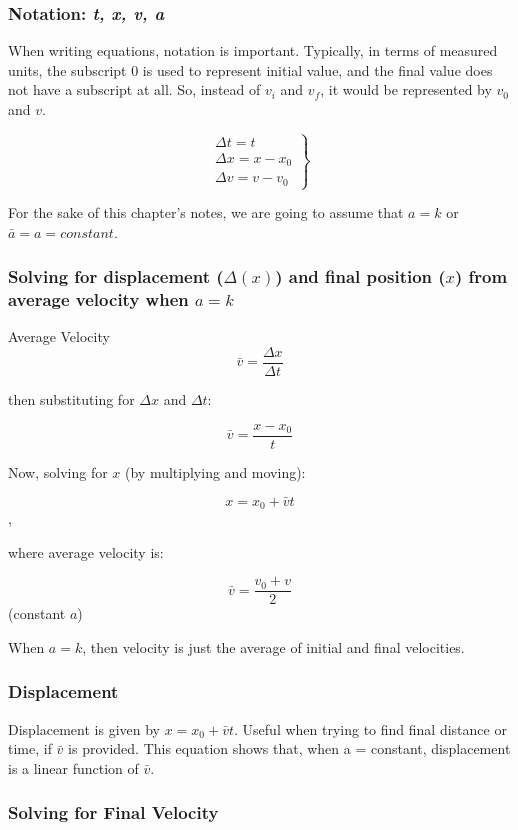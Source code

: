 \documentclass{article}
\begin{document}
\subsubsection{Notation: \emph{t, x, v, a}}

When writing equations, notation is important. Typically, in terms of measured units, the subscript 0 is used to represent initial {value}, and the final value does not have a subscript at all. So, instead of $v_i$ and $v_f$, it would be represented by $v_0$ and $v$.

\[\left. \begin{array}{l}
  \Delta{t} = t \\ \Delta{x} = x - x_0 \\ \Delta{v} = v - v_0 \end{array} \right\} \]

For the sake of this chapter's notes, we are going to assume that $a = k$ or $\bar{a} = a = constant$.


\subsubsection{Solving for displacement ($\Delta(x)$) and final position ($x$) from average velocity when $a = k$}
  
Average Velocity \[\bar{v} = \frac{\Delta{x}}{\Delta{t}}\]

then substituting for $\Delta{x}$ and $\Delta{t}$:

\[\bar{v} = \frac{x - x_0}{t}\]

Now, solving for $x$ (by multiplying and moving):

\[ x = x_0 + \bar{v} t \],

where average velocity is:

\[\bar{v} = \frac{v_0 + v}{2}\](constant $a$)

When $a=k$, then velocity is just the average of initial and final velocities.

\subsubsection{Displacement}

Displacement is given by $x = x_0 + \bar{v}t$. Useful when trying to find final distance or time, if $\bar{v}$ is provided.
This equation shows that, when a = constant, displacement is a linear function of $\bar{v}$.

\subsubsection{Solving for Final Velocity}
\end{document}
